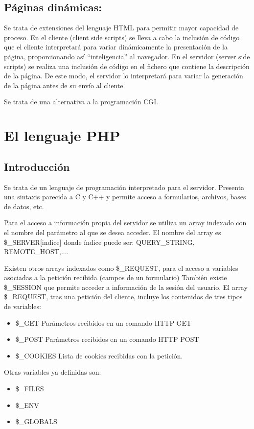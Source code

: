 \documentclass{apuntes}
\begin{document}
\subsection{Páginas dinámicas:}
Se trata de extensiones del lenguaje HTML para permitir mayor capacidad de proceso. En el cliente (client side scripts) se lleva a cabo la inclusión de código que el cliente interpretará para variar dinámicamente la presentación de la página, proporcionando así “inteligencia” al navegador. En el servidor (server side scripts) se realiza una inclusión de código en el fichero que contiene la descripción de la página. De este modo, el servidor lo interpretará para variar la generación de la página antes de su envío al cliente.

Se trata de una alternativa a la programación CGI.

\section{El lenguaje PHP}
\subsection{Introducción}
Se trata de un lenguaje de programación interpretado para el servidor. Presenta una sintaxis parecida a C y C++ y permite acceso a formularios, archivos, bases de datos, etc.

Para el acceso a información propia del servidor se utiliza un  array indexado con el nombre del parámetro al que se desea acceder. El nombre del array es \$\_SERVER[indice] donde índice puede ser: QUERY\_STRING, REMOTE\_HOST,....

Existen otros arrays indexados como \$\_REQUEST, para el acceso a variables asociadas a la petición recibida (campos de un formulario)
También existe \$\_SESSION que permite acceder a información de la sesión del usuario. El array \$\_REQUEST, tras una petición del cliente, incluye los contenidos de tres tipos de variables:
\begin{itemize}
\item \$\_GET Parámetros recibidos en un comando HTTP GET
\item \$\_POST Parámetros recibidos en un comando HTTP POST
\item \$\_COOKIES Lista de cookies recibidas con la petición.
\end{itemize}

Otras variables ya definidas son:
\begin{itemize}
\item\$\_FILES
\item\$\_ENV
\item\$\_GLOBALS
\end{itemize}
\end{document}
